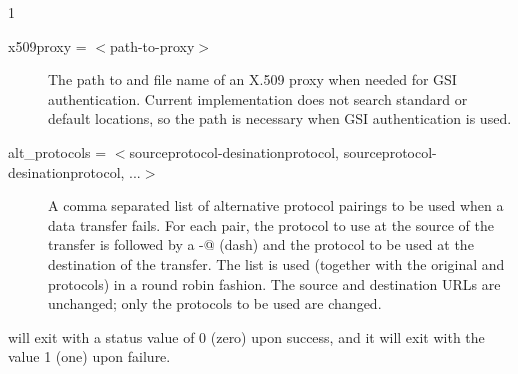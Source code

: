 \begin{ManPage}{\label{man-stork-submit}}{1}
\begin{description}


\item[x509proxy = $<$path-to-proxy$>$]
The path to and file name of an X.509 proxy when needed
for GSI authentication.
Current implementation does not search standard or default locations,
so the path is necessary when GSI authentication is used.


\item[alt\_protocols = $<$sourceprotocol-desinationprotocol, sourceprotocol-desinationprotocol, ...$>$]
A comma separated list of alternative protocol pairings to be used
when a data transfer fails.
For each pair, the protocol to use at the source of the transfer
is followed by a \verb@-@ (dash) and the protocol to be used
at the destination of the transfer.
The list is used
(together with the original 
and  protocols)
in a round robin fashion.
The source and destination URLs are unchanged;
only the protocols to be used are changed.


\end{description}


\begin{Options}
  \ToolArgsBaseDesc
  \StorknameDesc
\end{Options}

\ExitStatus

 will exit with a status value of 0 (zero) upon success,
and it will exit with the value 1 (one) upon failure.

\end{ManPage}
